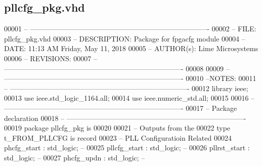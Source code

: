 \subsection{pllcfg\+\_\+pkg.\+vhd}
\label{pllcfg__pkg_8vhd_source}

\begin{DoxyCode}
00001 \textcolor{keyword}{-- ----------------------------------------------------------------------------}
00002 \textcolor{keyword}{-- FILE:          pllcfg\_pkg.vhd}
00003 \textcolor{keyword}{-- DESCRIPTION:   Package for fpgacfg module}
00004 \textcolor{keyword}{-- DATE:          11:13 AM Friday, May 11, 2018}
00005 \textcolor{keyword}{-- AUTHOR(s):     Lime Microsystems}
00006 \textcolor{keyword}{-- REVISIONS:}
00007 \textcolor{keyword}{-- ----------------------------------------------------------------------------}
00008 
00009 \textcolor{keyword}{-- ----------------------------------------------------------------------------}
00010 \textcolor{keyword}{--NOTES:}
00011 \textcolor{keyword}{-- ----------------------------------------------------------------------------}
00012 \textcolor{vhdlkeyword}{library }\textcolor{keywordflow}{ieee};
00013 \textcolor{vhdlkeyword}{use }ieee.std\_logic\_1164.\textcolor{keywordflow}{all};
00014 \textcolor{vhdlkeyword}{use }ieee.numeric\_std.\textcolor{keywordflow}{all};
00015 
00016 \textcolor{keyword}{-- ----------------------------------------------------------------------------}
00017 \textcolor{keyword}{-- Package declaration}
00018 \textcolor{keyword}{-- ----------------------------------------------------------------------------}
00019 \textcolor{keywordflow}{package }pllcfg_pkg \textcolor{keywordflow}{is}
00020    
00021 \textcolor{keyword}{   -- Outputs from the }
00022    \textcolor{keywordflow}{type} \textcolor{vhdlchar}{t_FROM_PLLCFG} \textcolor{keywordflow}{is} \textcolor{keywordflow}{record}
00023 \textcolor{keyword}{      -- PLL Configuratioin Related}
00024       \textcolor{vhdlchar}{phcfg_start}       \textcolor{vhdlchar}{:} \textcolor{comment}{std\_logic};\textcolor{keyword}{ --}
00025       \textcolor{vhdlchar}{pllcfg_start}      \textcolor{vhdlchar}{:} \textcolor{comment}{std\_logic};\textcolor{keyword}{ --}
00026       \textcolor{vhdlchar}{pllrst_start}      \textcolor{vhdlchar}{:} \textcolor{comment}{std\_logic};\textcolor{keyword}{ --}
00027       \textcolor{vhdlchar}{phcfg_updn}        \textcolor{vhdlchar}{:} \textcolor{comment}{std\_logic};\textcolor{keyword}{ --}

\end{DoxyCode}
